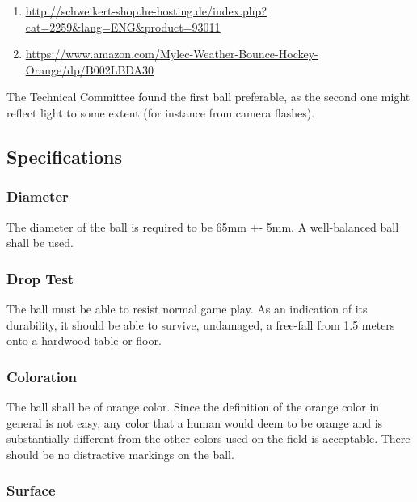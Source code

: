 \documentclass{article}
\begin{document}
\begin{enumerate}

\item \underline{\href{http://schweikert-shop.he-hosting.de/index.php?cat=2259&lang=ENG&product=93011}{http://schweikert-shop.he-hosting.de/index.php?cat=2259\&lang=ENG\&product=93011}}

\item \underline{\href{https://www.amazon.com/Mylec-Weather-Bounce-Hockey-Orange/dp/B002LBDA30}{https://www.amazon.com/Mylec-Weather-Bounce-Hockey-Orange/dp/B002LBDA30}}

\end{enumerate}

The Technical Committee found the first ball preferable, as the second one
might reflect light to some extent (for instance from camera flashes).

\subsection{Specifications}

\subsubsection{Diameter}

The diameter of the ball is required to be 65mm +- 5mm. A well-balanced ball
shall be used.

\subsubsection{Drop Test}

The ball must be able to resist normal game play. As an indication of its
durability, it should be able to survive, undamaged, a free-fall from 1.5
meters onto a hardwood table or floor.

\subsubsection{Coloration}

The ball shall be of orange color. Since the definition of the orange color in
general is not easy, any color that a human would deem to be orange and is
substantially different from the other colors used on the field is acceptable.
There should be no distractive markings on the ball.

\subsubsection{Surface}
\end{document}
